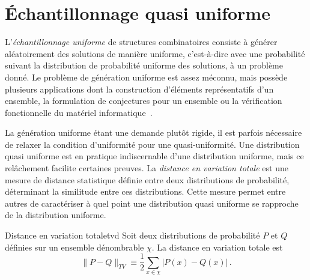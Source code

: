 
\section{Échantillonnage quasi uniforme}
\label{sec:echantillonnage-quasi-uniforme}

L'\textit{échantillonnage uniforme} de structures combinatoires consiste à générer aléatoirement des solutions de manière uniforme, c'est-à-dire avec une probabilité suivant la distribution de probabilité uniforme des solutions, à un problème donné. Le problème de génération uniforme est assez méconnu, mais possède plusieurs applications dont la construction d'éléments représentatifs d'un ensemble, la formulation de conjectures pour un ensemble ou la vérification fonctionnelle du matériel informatique~\cite{jerrumFastUniformGeneration1990, chakrabortyScalableNearlyUniform2013}.

La génération uniforme étant une demande plutôt rigide, il est parfois nécessaire de relaxer la condition d'uniformité pour une quasi-uniformité. Une distribution quasi uniforme est en pratique indiscernable d'une distribution uniforme, mais ce relâchement facilite certaines preuves. La \textit{distance en variation totale} est une mesure de distance statistique définie entre deux distributions de probabilité, déterminant la similitude entre ces distributions. Cette mesure permet entre autres de caractériser à quel point une distribution quasi uniforme se rapproche de la distribution uniforme.

\begin{subdefinition}{Distance en variation totale}{tvd}
    Soit deux distributions de probabilité $P$ et $Q$ définies sur un ensemble dénombrable $\chi$. La distance en variation totale est
    \begin{equation*}
        \lVert P - Q \rVert_{TV} \equiv \frac{1}{2} \sum_{x \in \chi} \lvert P(x) - Q(x) \rvert \,. 
    \end{equation*}
\end{subdefinition}

